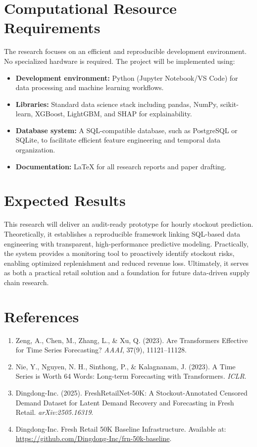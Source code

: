 \documentclass[11pt]{article}
\begin{document}
\section{Computational Resource Requirements}

The research focuses on an efficient and reproducible development environment. No specialized hardware is required. The project will be implemented using:

\begin{itemize}
  \item \textbf{Development environment:} Python (Jupyter Notebook/VS Code) for data processing and machine learning workflows.
  \item \textbf{Libraries:} Standard data science stack including pandas, NumPy, scikit-learn, XGBoost, LightGBM, and SHAP for explainability.
  \item \textbf{Database system:} A SQL-compatible database, such as PostgreSQL or SQLite, to facilitate efficient feature engineering and temporal data organization.
  \item \textbf{Documentation:} LaTeX for all research reports and paper drafting.
\end{itemize}

\section{Expected Results}

This research will deliver an audit-ready prototype for hourly stockout prediction. Theoretically, it establishes a reproducible framework linking SQL-based data engineering with transparent, high-performance predictive modeling. Practically, the system provides a monitoring tool to proactively identify stockout risks, enabling optimized replenishment and reduced revenue loss. Ultimately, it serves as both a practical retail solution and a foundation for future data-driven supply chain research.

\section*{References}

\begin{enumerate}
  \item Zeng, A., Chen, M., Zhang, L., \& Xu, Q. (2023). Are Transformers Effective for Time Series Forecasting? \emph{AAAI}, 37(9), 11121--11128.
  \item Nie, Y., Nguyen, N. H., Sinthong, P., \& Kalagnanam, J. (2023). A Time Series is Worth 64 Words: Long-term Forecasting with Transformers. \emph{ICLR}.
  \item Dingdong-Inc. (2025). FreshRetailNet-50K: A Stockout-Annotated Censored Demand Dataset for Latent Demand Recovery and Forecasting in Fresh Retail. \emph{arXiv:2505.16319}.
  \item Dingdong-Inc. Fresh Retail 50K Baseline Infrastructure. Available at: \url{https://github.com/Dingdong-Inc/frn-50k-baseline}.
\end{enumerate}
\end{document}
